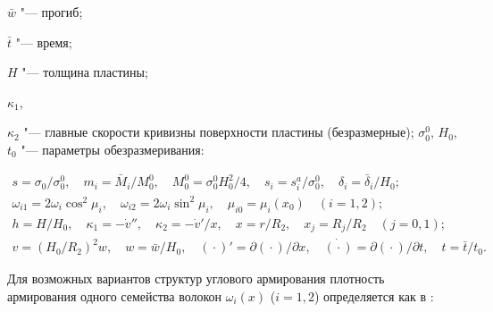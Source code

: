  $\bar{w}$ "--- прогиб;

 $\bar{t}$ "--- время;

 $H$ "--- толщина пластины;

 $\kappa_1$,

 $\kappa_2$ "--- главные скорости кривизны поверхности пластины (безразмерные); $\sigma_0^0$, $H_0$, $t_0$ "--- параметры обезразмеривания:

\begin{gather*}

s=\sigma_0/\sigma_0^0,\quad m_i=\bar{M}_i/M_0^0,\quad M_0^0=\sigma_0^0H_0^2/4,\quad s_i=s_i^a/\sigma_0^0,\quad \delta_i=\bar{\delta}_i/H_0;

\\

\omega_{i1}=2\omega_i\cos^2\mu_i,\quad \omega_{i2}=2\omega_i\sin^2\mu_i,\quad \mu_{i0}=\mu_i(x_0)\quad (i = 1, 2);

\\

h=H/H_0,\quad \kappa_1=-{\dot{v}}'',\quad \kappa_2=-{\dot{v}}'/x,\quad x=r/R_2,\quad x_j=R_j/R_2\quad (j=0, 1);

\\

v=(H_0/R_2)^2w,\quad w=\bar{w}/H_0,\quad ({}\cdot{})'=\partial({}\cdot{})/\partial x,\quad \dot{({}\cdot{})}=\partial({}\cdot{})/\partial t,\quad t=\bar{t}/t_0.

\end{gather*}



Для возможных вариантов структур углового армирования плотность армирования одного семейства волокон $\omega_i(x)$ ($i=1, 2$) определяется как в \cite{rom:bib16}:



